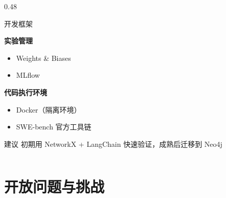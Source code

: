 \documentclass[aspectratio=169,10pt]{beamer}
\begin{document}
\begin{frame}
\begin{columns}[T]
\begin{column}{0.48\textwidth}
\begin{block}{开发框架}
        \vspace{0.2cm}

        \textbf{实验管理}
        \begin{itemize}
          \item Weights \& Biases
          \item MLflow
        \end{itemize}

        \vspace{0.2cm}

        \textbf{代码执行环境}
        \begin{itemize}
          \item Docker（隔离环境）
          \item SWE-bench 官方工具链
        \end{itemize}
      \end{block}

      \vspace{0.2cm}

      \begin{alertblock}{建议}
        \tiny
        初期用 NetworkX + LangChain 快速验证，成熟后迁移到 Neo4j
      \end{alertblock}
    \end{column}
  \end{columns}
\end{frame}

\section{开放问题与挑战}
\end{document}
